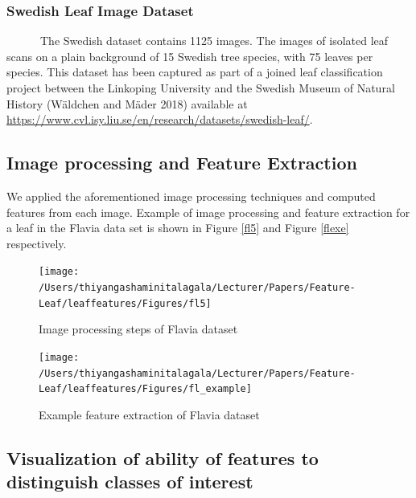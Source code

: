 \documentclass{article}
\begin{document}
\hypertarget{swedish-leaf-image-dataset}{%
\subsubsection{Swedish Leaf Image
Dataset}\label{swedish-leaf-image-dataset}}

~~~~~~The Swedish dataset contains 1125 images. The images of isolated
leaf scans on a plain background of 15 Swedish tree species, with 75
leaves per species. This dataset has been captured as part of a joined
leaf classification project between the Linkoping University and the
Swedish Museum of Natural History (Wäldchen and Mäder 2018) available at
\url{https://www.cvl.isy.liu.se/en/research/datasets/swedish-leaf/}.

\hypertarget{image-processing-and-feature-extraction}{%
\subsection{Image processing and Feature
Extraction}\label{image-processing-and-feature-extraction}}

We applied the aforementioned image processing techniques and computed
features from each image. Example of image processing and feature
extraction for a leaf in the Flavia data set is shown in Figure
\ref{fl5} and Figure \ref{flexe} respectively.

\begin{figure}[!ht]

{\centering \texttt{[image: /Users/thiyangashaminitalagala/Lecturer/Papers/Feature-Leaf/leaffeatures/Figures/fl5]} 

}

\caption{\label{fl5}Image processing steps of Flavia dataset}\label{fig:unnamed-chunk-37}
\end{figure}

\begin{figure}[!ht]

{\centering \texttt{[image: /Users/thiyangashaminitalagala/Lecturer/Papers/Feature-Leaf/leaffeatures/Figures/fl\_example]} 

}

\caption{\label{flexe}Example feature extraction of Flavia dataset}\label{fig:unnamed-chunk-38}
\end{figure}

\hypertarget{visualization-of-ability-of-features-to-distinguish-classes-of-interest}{%
\subsection{Visualization of ability of features to distinguish classes
of
interest}\label{visualization-of-ability-of-features-to-distinguish-classes-of-interest}}
\end{document}
